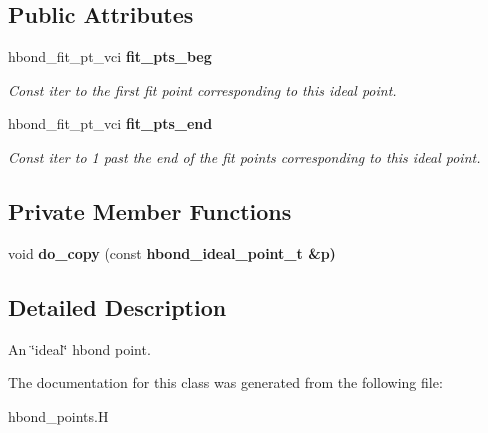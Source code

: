\subsection*{Public Attributes}
\begin{CompactItemize}
\item 
hbond\_\-fit\_\-pt\_\-vci \bf{fit\_\-pts\_\-beg}\label{classASCbase_1_1hbond__ideal__point__t_620a62e5bfaeb61bc5815745a60aed5c}

\begin{CompactList}\small\item\em Const iter to the first fit point corresponding to this ideal point. \item\end{CompactList}\item 
hbond\_\-fit\_\-pt\_\-vci \bf{fit\_\-pts\_\-end}\label{classASCbase_1_1hbond__ideal__point__t_fd82444a9d7addc28b06b24e9b9badee}

\begin{CompactList}\small\item\em Const iter to 1 past the end of the fit points corresponding to this ideal point. \item\end{CompactList}\end{CompactItemize}
\subsection*{Private Member Functions}
\begin{CompactItemize}
\item 
void \textbf{do\_\-copy} (const \bf{hbond\_\-ideal\_\-point\_\-t} \&p)\label{classASCbase_1_1hbond__ideal__point__t_7cc7e353e9bce5777ffdf83cda34778b}

\end{CompactItemize}


\subsection{Detailed Description}
An \char`\"{}ideal\char`\"{} hbond point. 



The documentation for this class was generated from the following file:\begin{CompactItemize}
\item 
hbond\_\-points.H\end{CompactItemize}
